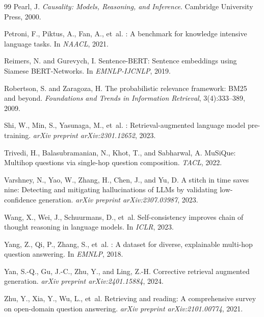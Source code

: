 \documentclass[10pt,twocolumn]{article}
\begin{document}
\begin{thebibliography}{99}
Pearl, J.
\newblock \emph{Causality: Models, Reasoning, and Inference}.
\newblock Cambridge University Press, 2000.

Petroni, F., Piktus, A., Fan, A., et~al.
: A benchmark for knowledge intensive language tasks.
\newblock In \emph{NAACL}, 2021.

Reimers, N. and Gurevych, I.
\newblock Sentence-{BERT}: Sentence embeddings using {Siamese BERT}-Networks.
\newblock In \emph{EMNLP-IJCNLP}, 2019.

Robertson, S. and Zaragoza, H.
\newblock The probabilistic relevance framework: {BM25} and beyond.
\newblock \emph{Foundations and Trends in Information Retrieval},
  3(4):333--389, 2009.

Shi, W., Min, S., Yasunaga, M., et~al.
: Retrieval-augmented language model pre-training.
\newblock \emph{arXiv preprint arXiv:2301.12652}, 2023.

Trivedi, H., Balasubramanian, N., Khot, T., and Sabharwal, A.
\newblock Mu{S}i{Q}ue: Multihop questions via single-hop question composition.
\newblock \emph{TACL}, 2022.

Varshney, N., Yao, W., Zhang, H., Chen, J., and Yu, D.
\newblock A stitch in time saves nine: Detecting and mitigating hallucinations
  of {LLMs} by validating low-confidence generation.
\newblock \emph{arXiv preprint arXiv:2307.03987}, 2023.

Wang, X., Wei, J., Schuurmans, D., et~al.
\newblock Self-consistency improves chain of thought reasoning in language
  models.
\newblock In \emph{ICLR}, 2023.

Yang, Z., Qi, P., Zhang, S., et~al.
: A dataset for diverse, explainable multi-hop question
  answering.
\newblock In \emph{EMNLP}, 2018.

Yan, S.-Q., Gu, J.-C., Zhu, Y., and Ling, Z.-H.
\newblock Corrective retrieval augmented generation.
\newblock \emph{arXiv preprint arXiv:2401.15884}, 2024.

Zhu, Y., Xia, Y., Wu, L., et~al.
\newblock Retrieving and reading: A comprehensive survey on open-domain
  question answering.
\newblock \emph{arXiv preprint arXiv:2101.00774}, 2021.

\end{thebibliography}
\end{document}
